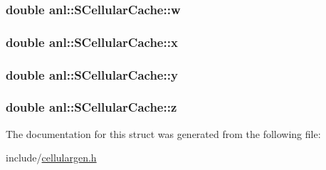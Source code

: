 \label{structanl_1_1SCellularCache_a49bc143bf599b60d212ab0bdc2a95f64}
\hypertarget{structanl_1_1SCellularCache_a483f2f965a07ba52182183a6b5e5698b}{
\subsubsection[{w}]{\setlength{\rightskip}{0pt plus 5cm}double {\bf anl::SCellularCache::w}}}
\label{structanl_1_1SCellularCache_a483f2f965a07ba52182183a6b5e5698b}
\hypertarget{structanl_1_1SCellularCache_a351e3016b04686dbaf81728ad020e546}{
\subsubsection[{x}]{\setlength{\rightskip}{0pt plus 5cm}double {\bf anl::SCellularCache::x}}}
\label{structanl_1_1SCellularCache_a351e3016b04686dbaf81728ad020e546}
\hypertarget{structanl_1_1SCellularCache_a0f52fd8340bda1283fb659e0b6f57015}{
\subsubsection[{y}]{\setlength{\rightskip}{0pt plus 5cm}double {\bf anl::SCellularCache::y}}}
\label{structanl_1_1SCellularCache_a0f52fd8340bda1283fb659e0b6f57015}
\hypertarget{structanl_1_1SCellularCache_ac72c3ba75a1250ef5111f9af52edb194}{
\subsubsection[{z}]{\setlength{\rightskip}{0pt plus 5cm}double {\bf anl::SCellularCache::z}}}
\label{structanl_1_1SCellularCache_ac72c3ba75a1250ef5111f9af52edb194}


The documentation for this struct was generated from the following file:\begin{DoxyCompactItemize}
\item 
include/\hyperlink{cellulargen_8h}{cellulargen.h}\end{DoxyCompactItemize}
